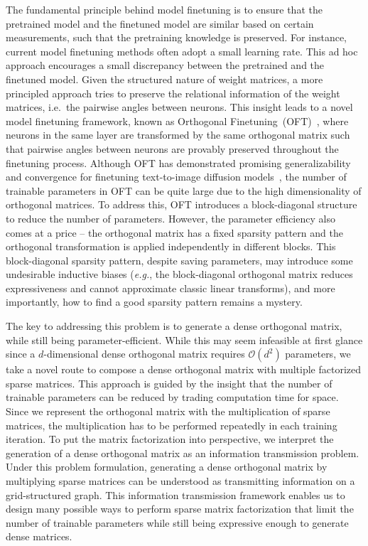 The fundamental principle behind model finetuning is to ensure that the pretrained model and the finetuned model are similar based on certain measurements, such that the pretraining knowledge is preserved. For instance, current model finetuning methods often adopt a small learning rate. This ad hoc approach encourages a small discrepancy between the pretrained and the finetuned model. Given the structured nature of weight matrices, a more principled approach  tries to preserve the relational information of the weight matrices, i.e.~the pairwise angles between neurons. This insight leads to a novel model finetuning framework, known as Orthogonal Finetuning~(OFT)~\cite{qiu2023controlling}, where neurons in the same layer are transformed by the same orthogonal matrix such that pairwise angles between neurons are provably preserved throughout the finetuning process. Although OFT has demonstrated promising generalizability and convergence for finetuning text-to-image diffusion models~\cite{qiu2023controlling}, the number of trainable parameters in OFT can be quite large due to the high dimensionality of orthogonal matrices. To address this, OFT introduces a block-diagonal structure to reduce the number of parameters. However, the parameter efficiency also comes at a price -- the orthogonal matrix has a fixed sparsity pattern and the orthogonal transformation is applied independently in different blocks. This block-diagonal sparsity pattern, despite saving parameters, may introduce some undesirable inductive biases (\emph{e.g.}, the block-diagonal orthogonal matrix reduces expressiveness and cannot approximate classic linear transforms), and more importantly, how to find a good sparsity pattern remains a mystery.

The key to addressing this problem is to generate a dense orthogonal matrix, while still being parameter-efficient. While this may seem infeasible at first glance since a $d$-dimensional dense orthogonal matrix requires $\mathcal{O}(d^2)$ parameters, we take a novel route to compose a dense orthogonal matrix with multiple factorized sparse matrices. This approach is guided by the insight that the number of trainable parameters can be reduced by trading computation time for space. Since we represent the orthogonal matrix with the multiplication of sparse matrices, the multiplication has to be performed repeatedly in each training iteration. To put the matrix factorization into perspective, we interpret the generation of a dense orthogonal matrix as an information transmission problem. Under this problem formulation, generating a dense orthogonal matrix by multiplying sparse matrices can be understood as transmitting information on a grid-structured graph. This information transmission framework enables us to design many possible ways to perform sparse matrix factorization that limit the number of trainable parameters while still being expressive enough to generate dense matrices.

